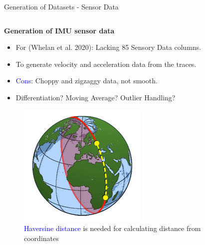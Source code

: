\documentclass[aspectratio=169, 8pt]{beamer}
\begin{document}
\begin{frame}{Generation of Datasets - Sensor Data}
    \begin{columns}[T]
        \begin{column}{0.5\linewidth}
           \textbf{Generation of IMU sensor data} 
           \begin{itemize}
               \item For (Whelan et al. 2020): Lacking 85 Sensory Data columns.  
               \item To generate velocity and acceleration data from the traces.
               \item \textcolor{blue}{Cons}: Choppy and zigzaggy data, not smooth.
               \item Differentiation? Moving Average? Outlier Handling?
           \end{itemize}

           \begin{figure}
                \centering
                \includegraphics[width = 0.4 \linewidth]{images/haversine.png}
                \caption{\textcolor{blue}{Haversine distance} is needed for calculating distance from coordinates}
                \label{fig:enter-label}
            \end{figure}

            
        \end{column}
        

\end{columns}
\end{frame}
\end{document}
